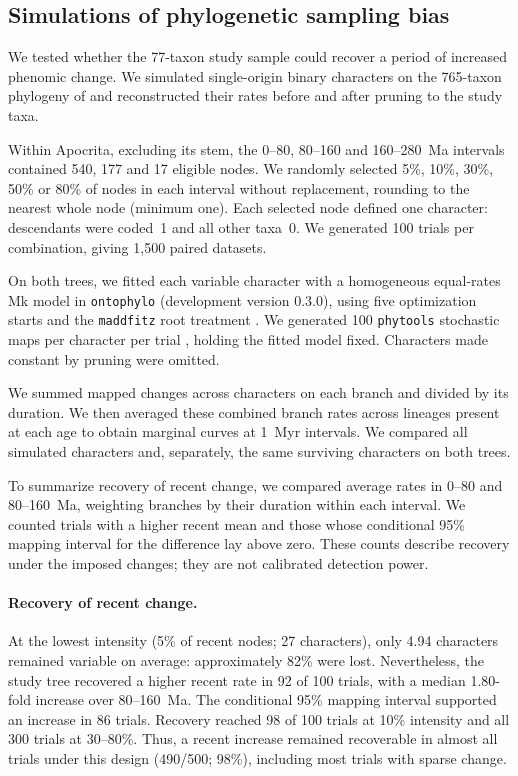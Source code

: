 \subsection{Simulations of phylogenetic sampling bias}

We tested whether the 77-taxon study sample could recover a period of increased
phenomic change. We simulated single-origin binary characters on the 765-taxon
phylogeny of \citet{blaimer2023} and reconstructed their rates before and after
pruning to the study taxa.

Within Apocrita, excluding its stem, the 0--80, 80--160 and 160--280~Ma
intervals contained 540, 177 and 17 eligible nodes. We randomly selected
5\%, 10\%, 30\%, 50\% or 80\% of nodes in each interval without replacement,
rounding to the nearest whole node (minimum one). Each selected node defined
one character: descendants were coded~1 and all other taxa~0. We generated
100 trials per combination, giving 1,500 paired datasets.

On both trees, we fitted each variable character with a homogeneous equal-rates
Mk model in \texttt{ontophylo} (development version 0.3.0), using five
optimization starts and the \texttt{maddfitz} root treatment
\citep{fitzjohn2009}. We generated 100 \texttt{phytools} stochastic maps per
character per trial \citep{revell2024}, holding the fitted model fixed.
Characters made constant by pruning were omitted.

We summed mapped changes across characters on each branch and divided by its
duration. We then averaged these combined branch rates across lineages present
at each age to obtain marginal curves at 1~Myr intervals. We compared all
simulated characters and, separately, the same surviving characters on both
trees.

To summarize recovery of recent change, we compared average rates in 0--80 and
80--160~Ma, weighting branches by their duration within each interval. We
counted trials with a higher recent mean and those whose conditional 95\%
mapping interval for the difference lay above zero. These counts describe
recovery under the imposed changes; they are not calibrated detection power.

\paragraph{Recovery of recent change.}
At the lowest intensity (5\% of recent nodes; 27 characters), only 4.94
characters remained variable on average: approximately 82\% were lost.
Nevertheless, the study tree recovered a higher recent rate in 92 of 100
trials, with a median 1.80-fold increase over 80--160~Ma. The conditional 95\%
mapping interval supported an increase in 86 trials. Recovery reached
98 of 100 trials at 10\% intensity and all 300 trials at 30--80\%.
Thus, a recent increase remained recoverable in almost all trials under this
design (490/500; 98\%), including most trials with sparse change.
